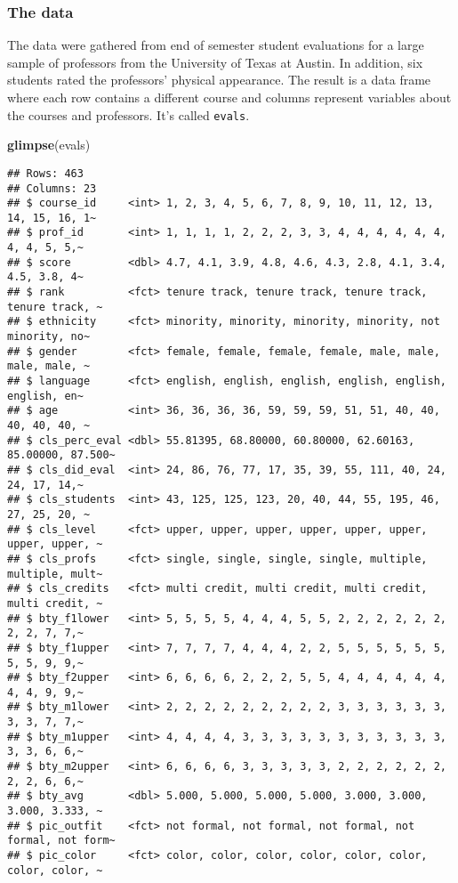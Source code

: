 \documentclass[
]{article}
\newenvironment{Shaded}{\begin{snugshade}}{\end{snugshade}}
\newcommand{\FunctionTok}[1]{\textcolor[rgb]{0.13,0.29,0.53}{\textbf{#1}}}
\newcommand{\NormalTok}[1]{#1}
\begin{document}
\subsubsection{The data}\label{the-data}

The data were gathered from end of semester student evaluations for a
large sample of professors from the University of Texas at Austin. In
addition, six students rated the professors' physical appearance. The
result is a data frame where each row contains a different course and
columns represent variables about the courses and professors. It's
called \texttt{evals}.

\begin{Shaded}
\begin{Highlighting}[]
\FunctionTok{glimpse}\NormalTok{(evals)}
\end{Highlighting}
\end{Shaded}

\begin{verbatim}
## Rows: 463
## Columns: 23
## $ course_id     <int> 1, 2, 3, 4, 5, 6, 7, 8, 9, 10, 11, 12, 13, 14, 15, 16, 1~
## $ prof_id       <int> 1, 1, 1, 1, 2, 2, 2, 3, 3, 4, 4, 4, 4, 4, 4, 4, 4, 5, 5,~
## $ score         <dbl> 4.7, 4.1, 3.9, 4.8, 4.6, 4.3, 2.8, 4.1, 3.4, 4.5, 3.8, 4~
## $ rank          <fct> tenure track, tenure track, tenure track, tenure track, ~
## $ ethnicity     <fct> minority, minority, minority, minority, not minority, no~
## $ gender        <fct> female, female, female, female, male, male, male, male, ~
## $ language      <fct> english, english, english, english, english, english, en~
## $ age           <int> 36, 36, 36, 36, 59, 59, 59, 51, 51, 40, 40, 40, 40, 40, ~
## $ cls_perc_eval <dbl> 55.81395, 68.80000, 60.80000, 62.60163, 85.00000, 87.500~
## $ cls_did_eval  <int> 24, 86, 76, 77, 17, 35, 39, 55, 111, 40, 24, 24, 17, 14,~
## $ cls_students  <int> 43, 125, 125, 123, 20, 40, 44, 55, 195, 46, 27, 25, 20, ~
## $ cls_level     <fct> upper, upper, upper, upper, upper, upper, upper, upper, ~
## $ cls_profs     <fct> single, single, single, single, multiple, multiple, mult~
## $ cls_credits   <fct> multi credit, multi credit, multi credit, multi credit, ~
## $ bty_f1lower   <int> 5, 5, 5, 5, 4, 4, 4, 5, 5, 2, 2, 2, 2, 2, 2, 2, 2, 7, 7,~
## $ bty_f1upper   <int> 7, 7, 7, 7, 4, 4, 4, 2, 2, 5, 5, 5, 5, 5, 5, 5, 5, 9, 9,~
## $ bty_f2upper   <int> 6, 6, 6, 6, 2, 2, 2, 5, 5, 4, 4, 4, 4, 4, 4, 4, 4, 9, 9,~
## $ bty_m1lower   <int> 2, 2, 2, 2, 2, 2, 2, 2, 2, 3, 3, 3, 3, 3, 3, 3, 3, 7, 7,~
## $ bty_m1upper   <int> 4, 4, 4, 4, 3, 3, 3, 3, 3, 3, 3, 3, 3, 3, 3, 3, 3, 6, 6,~
## $ bty_m2upper   <int> 6, 6, 6, 6, 3, 3, 3, 3, 3, 2, 2, 2, 2, 2, 2, 2, 2, 6, 6,~
## $ bty_avg       <dbl> 5.000, 5.000, 5.000, 5.000, 3.000, 3.000, 3.000, 3.333, ~
## $ pic_outfit    <fct> not formal, not formal, not formal, not formal, not form~
## $ pic_color     <fct> color, color, color, color, color, color, color, color, ~
\end{verbatim}
\end{document}
